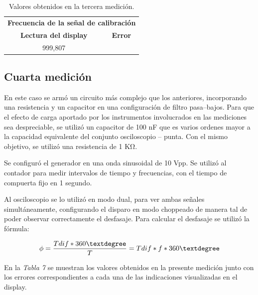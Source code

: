 \documentclass{article}
\begin{document}
\begin{table}[!hbt]
	\begin{center}
		\begin{tabular}{|c|c|} \hline
			\multicolumn{2}{|c|}{\textbf{Frecuencia de la señal de calibración}} \\\cline{1-2}
			\textbf{Lectura del display} & \textbf{Error} \\\hline
			999,807 & \\\hline
		\end{tabular}

	\caption{Valores obtenidos en la tercera medición.}
	\end{center}
\end{table}
\medskip



\subsection{Cuarta medición}
\medskip

	En este caso se armó un circuito más complejo que los anteriores, incorporando una resistencia y un capacitor en una configuración de filtro pasa–bajos. Para que el efecto de carga aportado por los instrumentos involucrados en las mediciones sea despreciable, se utilizó un capacitor de 100 nF que es varios ordenes mayor a la capacidad equivalente del conjunto osciloscopio – punta. Con el mismo objetivo, se utilizó una resistencia de 1 KΩ.
	\par
	Se configuró el generador en una onda sinusoidal de 10 Vpp. Se utilizó al contador para medir  intervalos de tiempo y frecuencias, con el tiempo de compuerta fijo en 1 segundo.
	\par
	Al osciloscopio se lo utilizó en modo dual, para ver ambas señales simultáneamente, configurando el disparo en modo choppeado de manera tal de poder observar correctamente el desfasaje. Para calcular el desfasaje se utilizó la fórmula:
\medskip

\begin{equation}
	\phi = {Tdif * 360° \over T} = {Tdif * f * 360°}
\end{equation}
\bigskip

	En la \textit{Tabla 7} se muestran los valores obtenidos en la presente medición junto con los errores correspondientes a cada una de las indicaciones visualizadas en el display.
\bigskip
\end{document}
